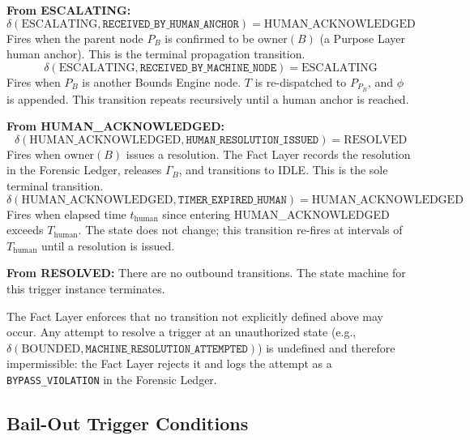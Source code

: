 \bigskip

\noindent\textbf{From ESCALATING:}
\begin{equation}
\delta(\text{ESCALATING}, \texttt{RECEIVED\_BY\_HUMAN\_ANCHOR}) = \text{HUMAN\_ACKNOWLEDGED}
\end{equation}
Fires when the parent node $P_B$ is confirmed to be $\text{owner}(B)$ (a Purpose Layer human anchor). This is the terminal propagation transition.
\begin{equation}
\delta(\text{ESCALATING}, \texttt{RECEIVED\_BY\_MACHINE\_NODE}) = \text{ESCALATING}
\end{equation}
Fires when $P_B$ is another Bounds Engine node. $T$ is re-dispatched to $P_{P_B}$, and $\phi$ is appended. This transition repeats recursively until a human anchor is reached.

\bigskip

\noindent\textbf{From HUMAN\_ACKNOWLEDGED:}
\begin{equation}
\delta(\text{HUMAN\_ACKNOWLEDGED}, \texttt{HUMAN\_RESOLUTION\_ISSUED}) = \text{RESOLVED}
\end{equation}
Fires when $\text{owner}(B)$ issues a resolution. The Fact Layer records the resolution in the Forensic Ledger, releases $\Gamma_B$, and transitions to IDLE. This is the sole terminal transition.
\begin{equation}
\delta(\text{HUMAN\_ACKNOWLEDGED}, \texttt{TIMER\_EXPIRED\_HUMAN}) = \text{HUMAN\_ACKNOWLEDGED}
\end{equation}
Fires when elapsed time $t_{\text{human}}$ since entering HUMAN\_ACKNOWLEDGED exceeds $T_{\text{human}}$. The state does not change; this transition re-fires at intervals of $T_{\text{human}}$ until a resolution is issued.

\bigskip

\noindent\textbf{From RESOLVED:} There are no outbound transitions. The state machine for this trigger instance terminates.

\bigskip

The Fact Layer enforces that no transition not explicitly defined above may occur. Any attempt to resolve a trigger at an unauthorized state (e.g., $\delta(\text{BOUNDED}, \texttt{MACHINE\_RESOLUTION\_ATTEMPTED})$) is undefined and therefore impermissible: the Fact Layer rejects it and logs the attempt as a \texttt{BYPASS\_VIOLATION} in the Forensic Ledger.

\subsection{Bail-Out Trigger Conditions}
\label{sec:bailout-trigger-conditions}

